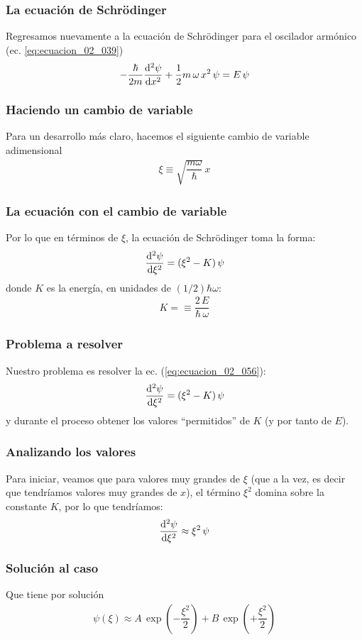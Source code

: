 \documentclass[12pt]{beamer}
\begin{document}
\begin{frame}
\frametitle{La ecuación de Schrödinger}
Regresamos nuevamente a la ecuación de Schrödinger para el oscilador armónico (ec. \ref{eq:ecuacion_02_039})
\begin{align*}
- \dfrac{\hbar}{2 m} \dv[2]{\psi}{x} + \dfrac{1}{2} m \, \omega \, x^{2} \, \psi = E \, \psi  
\end{align*}
\end{frame}
\begin{frame}
\frametitle{Haciendo un cambio de variable}
Para un desarrollo más claro, hacemos el siguiente cambio de variable adimensional
\begin{align}
\xi \equiv \sqrt{ \dfrac{m \omega}{\hbar}} \, x
    \label{eq:ecuacion_02_055}
\end{align}
\end{frame}
\begin{frame}
\frametitle{La ecuación con el cambio de variable}
Por lo que en términos de $\xi$, la ecuación de Schrödinger toma la forma:
\begin{align}
\dv[2]{\psi}{\xi} = (\xi^{2} - K) \, \psi
    \label{eq:ecuacion_02_056}
\end{align}
donde $K$ es la energía, \pause en unidades de $(1/2) \hbar \omega$:
\begin{align}
K = \equiv \dfrac{2 \, E}{\hbar \, \omega}
    \label{eq:ecuacion_02_057}
\end{align}
\end{frame}
\begin{frame}
\frametitle{Problema a resolver}
Nuestro problema es resolver la ec. (\ref{eq:ecuacion_02_056}):
\begin{align*}
\dv[2]{\psi}{\xi} = (\xi^{2} - K) \, \psi
\end{align*}
\pause
y durante el proceso obtener los valores \enquote{permitidos} de $K$ (y por tanto de $E$).
\end{frame}
\begin{frame}
\frametitle{Analizando los valores}
Para iniciar, veamos que para valores muy grandes de $\xi$ (que a la vez, es decir que tendríamos valores muy grandes de $x$), el término $\xi^{2}$ domina sobre la constante $K$, por lo que tendríamos:
\pause
\begin{align}
\dv[2]{\psi}{\xi} \approx \xi^{2} \, \psi
    \label{eq:ecuacion_02_058}
\end{align}
\end{frame}
\begin{frame}
\frametitle{Solución al caso}
Que tiene por solución
\begin{align}
\psi (\xi) \approx A \, \exp \left( - \dfrac{\xi^{2}}{2} \right) + B \, \exp \left( + \dfrac{\xi^{2}}{2} \right)
    \label{eq:ecuacion_02_059}
\end{align}
\end{frame}
\end{document}
